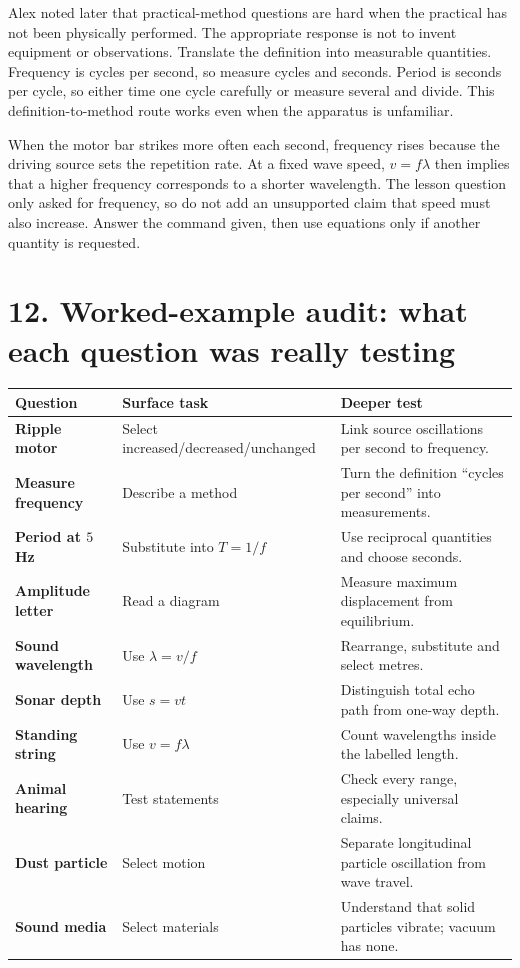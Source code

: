 \documentclass[11pt,a4paper]{article}
\begin{document}
Alex noted later that practical-method questions are hard when the practical has not been physically performed. The appropriate response is not to invent equipment or observations. Translate the definition into measurable quantities. Frequency is cycles per second, so measure cycles and seconds. Period is seconds per cycle, so either time one cycle carefully or measure several and divide. This definition-to-method route works even when the apparatus is unfamiliar.

When the motor bar strikes more often each second, frequency rises because the driving source sets the repetition rate. At a fixed wave speed, $v=f\lambda$ then implies that a higher frequency corresponds to a shorter wavelength. The lesson question only asked for frequency, so do not add an unsupported claim that speed must also increase. Answer the command given, then use equations only if another quantity is requested.

\section*{12. Worked-example audit: what each question was really testing}
\begin{tabularx}{\linewidth}{>{\bfseries}p{.22\linewidth}X X}
\toprule Question & Surface task & Deeper test\\\midrule
Ripple motor & Select increased/decreased/unchanged & Link source oscillations per second to frequency.\\
Measure frequency & Describe a method & Turn the definition ``cycles per second'' into measurements.\\
Period at $5$ Hz & Substitute into $T=1/f$ & Use reciprocal quantities and choose seconds.\\
Amplitude letter & Read a diagram & Measure maximum displacement from equilibrium.\\
Sound wavelength & Use $\lambda=v/f$ & Rearrange, substitute and select metres.\\
Sonar depth & Use $s=vt$ & Distinguish total echo path from one-way depth.\\
Standing string & Use $v=f\lambda$ & Count wavelengths inside the labelled length.\\
Animal hearing & Test statements & Check every range, especially universal claims.\\
Dust particle & Select motion & Separate longitudinal particle oscillation from wave travel.\\
Sound media & Select materials & Understand that solid particles vibrate; vacuum has none.\\\bottomrule
\end{tabularx}
\end{document}
